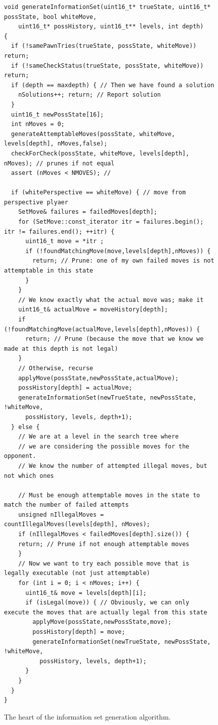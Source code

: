 \documentclass[conference]{IEEEtran}
\begin{document}
\begin{figure}
\begin{lstlisting}
void generateInformationSet(uint16_t* trueState, uint16_t* possState, bool whiteMove, 
	uint16_t* possHistory, uint16_t** levels, int depth)
{
  if (!samePawnTries(trueState, possState, whiteMove)) return;  
  if (!sameCheckStatus(trueState, possState, whiteMove)) return; 
  if (depth == maxdepth) { // Then we have found a solution
	nSolutions++; return; // Report solution
  }
  uint16_t newPossState[16]; 
  int nMoves = 0;
  generateAttemptableMoves(possState, whiteMove, levels[depth], nMoves,false);
  checkForCheck(possState, whiteMove, levels[depth], nMoves); // prunes if not equal
  assert (nMoves < NMOVES); // 

  if (whitePerspective == whiteMove) { // move from perspective plyaer 
    SetMove& failures = failedMoves[depth];
    for (SetMove::const_iterator itr = failures.begin(); itr != failures.end(); ++itr) {
      uint16_t move = *itr ;
      if (!foundMatchingMove(move,levels[depth],nMoves)) {
        return; // Prune: one of my own failed moves is not attemptable in this state
      }
    }
    // We know exactly what the actual move was; make it
    uint16_t& actualMove = moveHistory[depth];
    if (!foundMatchingMove(actualMove,levels[depth],nMoves)) {
      return; // Prune (because the move that we know we made at this depth is not legal)
    }
    // Otherwise, recurse 
    applyMove(possState,newPossState,actualMove);
    possHistory[depth] = actualMove;
    generateInformationSet(newTrueState, newPossState, !whiteMove, 
      possHistory, levels, depth+1);
  } else { 
    // We are at a level in the search tree where 
    // we are considering the possible moves for the opponent.
    // We know the number of attempted illegal moves, but not which ones

    // Must be enough attemptable moves in the state to match the number of failed attempts
    unsigned nIllegalMoves = countIllegalMoves(levels[depth], nMoves);
    if (nIllegalMoves < failedMoves[depth].size()) {
	return; // Prune if not enough attemptable moves
    }
    // Now we want to try each possible move that is legally executable (not just attemptable) 
    for (int i = 0; i < nMoves; i++) {
      uint16_t& move = levels[depth][i];
      if (isLegal(move)) { // Obviously, we can only execute the moves that are actually legal from this state
        applyMove(possState,newPossState,move);
        possHistory[depth] = move;
        generateInformationSet(newTrueState, newPossState, !whiteMove, 
          possHistory, levels, depth+1);
      }
    }
  }
}
\end{lstlisting}
\caption{The heart of the information set generation algorithm.}
\label{codelisting}
\end{figure}
\end{document}
